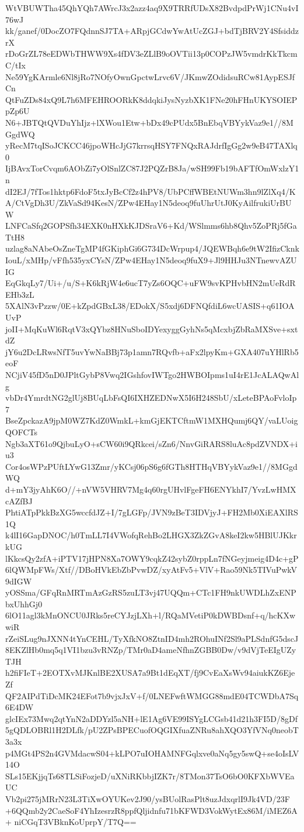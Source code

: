 WtVBUWTha45QhYQh7AWrcJ3x2azz4aq9X9TRRfUDsX82BvdpdPrWj1CNu4vI76wJ
kk/ganef/0DocZO7FQdnnSJ7TA+ARpjGCdwYwAtUcZGJ+bdTjBRV2Y4SfsiddzrX
rDoGrZL78eEDWbTHWW9Xs4fDV3eZLlB9oOVTii13p0COPzJW5vmdrKkTkcmC/tIx
Ne59YgKArmle6Nl8jRo7NOfyOwnGpctwLrvc6V/JKmwZOdidsuRCw81AypESJfCn
QtFuZDs84xQ9L7h6MFEHROORkK8ddqkiJysNyzbXK1FNe20hFHnUKYSOIEPpZp6U
N6+JBTQtQVDuYhIjz+lXWou1Etw+bDx49cPUdx5BnEbqVBYykVaz9e1//8MGgdWQ
yRecM7tqISoJCKCC46jpoWHcJjG7krrsqHSY7FNQxRAJdrfIgGg2w9eB47TAXlq0
IjBAvxTorCvqm6AObZi7yOlSnlZC87J2PQZrB8Ja/wSH99Fb19bAFTfOmWxlzY1n
dI2EJ/7fTos1hktp6FdoF5txJyBcCf2z4hPV8/UbPCffWBEtNUWm3hn9lZlXq4/K
A/CtVgDh3U/ZkVaSd94KesN/ZPw4EHay1N5deoq9fuUhrUtJ0KyAilfrukiUrBUW
LNFCaSfq2GOPSfh34EXK0nHXkKJDSraV6+Kd/WSlmms6hb8Qhv5ZoPRj5fGaTtH8
uzlag8aNAbeOsZneTgMP4fGKiphGi6G734DcWrpup4/JQEWBqh6e9tW2IfizCknk
IouL/xMHp/vFfh535yxCYsN/ZPw4EHay1N5deoq9fuX9+Jl9HHJu3NTnewvAZUIG
EqGkqLy7/Ui+/u/S+K6kRjW4e6ucT7yZs6OQC+uFW9svKPHvbHN2mUeRdREHb3zL
5XAlN3vPzzw/0E+kZpdGBxL38/EDokX/S5xdj6DFNQfdiL6wcUASIS+q61IOAUvP
joII+MqKuWl6RqtV3xQYbz8HNuSboIDYexyggGyhNs5qMcxbjZbRaMXSve+sxtdZ
jY6u2DcLRwsNfT5uvYwNaBBj73p1amn7RQvfb+aFx2lpyKm+GXA407uYHlRb5eoF
NCjiV45fD5nD0JPltGybP8Vwq2IGshfovIWTgo2HWBOIpms1uI4rE1JcALAQwAlg
vbDr4YmrdtNG2glUj8BUqLbFsQI6IXHZEDNwX5I6H248SbU/xLeteBPAoFvloIp7
BseZpckazA9jpM0WZ7KdZ0WmkL+kmGjEKTCftmW1MXHQumj6QY/vaLUoigQOFCTs
Ngb3aXT61o9QjbuLyO+sCW60i9QRkcei/sZn6/NnvGiRARS8luAc8pdZVNDX+iu3
Cor4osWPzPUftLYwG13Zmr/yKCsj06pS6g6fGTh8HTHqVBYykVaz9e1//8MGgdWQ
d+mY3jyAhK6O//+nVW5VHRV7Mg4q60rgUHvlFgeFH6ENYkhI7/YvzLwHMXcAZfBJ
PhtiATpPkkBzXG5wccfdJZ+I/7gLGFp/JVN9zBeT3IDVjyJ+FH2Mb0XiEAXlRS1Q
k4lI16GapDNOC/h0TmLL7I4VWofqRehBo2LHGX3ZkZGvA8keI2kw5HBlUJKkrkUG
lKkcsQy2zfA+iPTV17jHPN8Xa7OWY9cqkZ42sybZ0rppLn7fNGeyjmeig4D4c+gP
6lQWMpFWs/Xtf//DBoHVkEbZbPvwDZ/xyAtFv5+VlV+Rao59Nk5TIVuPwkV9dIGW
yOSSma/GFqRnMRTmAzGzRS5zuLT3vj47UQQm+CTc1FH9nkUWDLhZxENPbxUhhGj0
6lO11agl3kMnONCU0JRks5reCYJzjLXh+l/RQaMVetiP0kDWBDsnf+q/hcKXwwiR
rZeiSLug9nJXNN4tYnCEHL/TyXfkNO8ZtnID4mh2ROhuINf2Sl9aPLSdnfG5dscJ
8EKZlHb0mq5q1VI1bzu3vRNZp/TMr0aD4ameNfhnZGBB0Dw/v9dVjTeEIgUZyTJH
h2fiFIeT+2EOTXvMJKnlBE2XUSA7a9Bt1dEqXT/fj9CvEaXsWv94aiukKZ6EjeZf
QF2AIPdTiDcMK24EFot7b9vjxJxV+f/0LNEFwftWMGG88mdE04TCWDbA7Sq6E4DW
glcIEx73Mwq2qtYnN2aDDYzl5aNH+lE1Ag6VE99ISYgLCGsb41d21h3FI5D/8gDf
5gQDLOBRl1H2DLfk/pU2ZPsBPECuofOQGIXfuaZNRu8ahXQO3YfVNq0neobT3a3x
p4MGt4PS2n4GVMdacwS04+kLPO7uIOHAMNFGqlxve0aNq5gy5swQ+se4oIsLV14O
SLs15EKjjqTs68TLSiFozjeD/uXNiRKbbjIZK7r/8TMon37TsO6bO0KFXbWVEaUC
Vb2pi275jMRrN23L3TiXwOYUKev2J90/ysBUolRasPlt8uzJdxqrlI9Jk4VD/23F
+6QQmb2y2CaeSoF4YhIzesrzR8ppfQljidnfu71bKFWD3VokWytEx86M/iMEZ6A+
niCGqT3VBknKoUprpY/T7Q==
